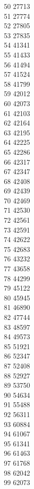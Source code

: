 { 50	27713 \\
 51	27774 \\
 52	27805 \\
 53	27835 \\
 54	41341 \\
 55	41433 \\
 56	41494 \\
 57	41524 \\
 58	41799 \\
 59	42012 \\
 60	42073 \\
 61	42103 \\
 62	42164 \\
 63	42195 \\
 64	42225 \\
 65	42286 \\
 66	42317 \\
 67	42347 \\
 68	42408 \\
 69	42439 \\
 70	42469 \\
 71	42530 \\
 72	42561 \\
 73	42591 \\
 74	42622 \\
 75	42683 \\
 76	43232 \\
 77	43658 \\
 78	44299 \\
 79	45122 \\
 80	45945 \\
 81	46890 \\
 82	47744 \\
 83	48597 \\
 84	49573 \\
 85	51921 \\
 86	52347 \\
 87	52408 \\
 88	52927 \\
 89	53750 \\
 90	54634 \\
 91	55488 \\
 92	56311 \\
 93	60884 \\
 94	61067 \\
 95	61341 \\
 96	61463 \\
 97	61768 \\
 98	62042 \\
 99	62073 \\
}

